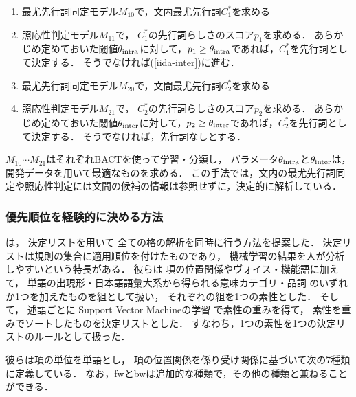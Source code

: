 \documentclass[japanese]{jnlp_1.4}
\newcommand{\newcite}[1]{}
\begin{document}
\begin{enumerate}
\item 最尤先行詞同定モデル$M_{10}$で，文内最尤先行詞$C_1^*$を求める
\item 照応性判定モデル$M_{11}$で，
$C_1^*$の先行詞らしさのスコア$p_1$を求める．
あらかじめ定めておいた閾値$\theta_{\rm intra}$に対して，$p_1 \geq \theta_{\rm intra}$であれば，$C_1^*$を先行詞として決定する．
そうでなければ(\ref{iida-inter})に進む．
\item 最尤先行詞同定モデル$M_{20}$で，文間最尤先行詞$C_2^*$を求める \label{iida-inter}
\item 照応性判定モデル$M_{21}$で，
$C_2^*$の先行詞らしさのスコア$p_2$を求める．
あらかじめ定めておいた閾値$\theta_{\rm inter}$に対して，$p_2 \geq \theta_{\rm inter}$であれば，$C_2^*$を先行詞として決定する．
そうでなければ，先行詞なしとする．
\end{enumerate}
$M_{10} \cdots M_{21}$はそれぞれBACTを使って学習・分類し，
パラメータ$\theta_{\rm intra}$と$\theta_{\rm inter}$は，開発データを用いて最適なものを求める．
この手法では，文内の最尤先行詞同定や照応性判定には文間の候補の情報は参照せずに，決定的に解析している．


\subsubsection{優先順位を経験的に決める方法}

\newcite{Taira:2008:EMNLP}は，
決定リストを用いて
全ての格の解析を同時に行う方法を提案した．
決定リストは規則の集合に適用順位を付けたものであり，
機械学習の結果を人が分析しやすいという特長がある．
彼らは
項の位置関係やヴォイス・機能語に加えて，
単語の出現形・日本語語彙大系\cite{goitaikei}から得られる意味カテゴリ・品詞
のいずれか1つを加えたものを組として扱い，
それぞれの組を1つの素性とした．
そして，
述語ごとに
Support Vector Machineの学習
で素性の重みを得て，
素性を重みでソートしたものを決定リストとした．
すなわち，1つの素性を1つの決定リストのルールとして扱った．



彼らは項の単位を単語とし，
項の位置関係を係り受け関係に基づいて次の7種類に定義している．
なお，fwとbwは追加的な種類で，その他の種類と兼ねることができる．
\end{document}
